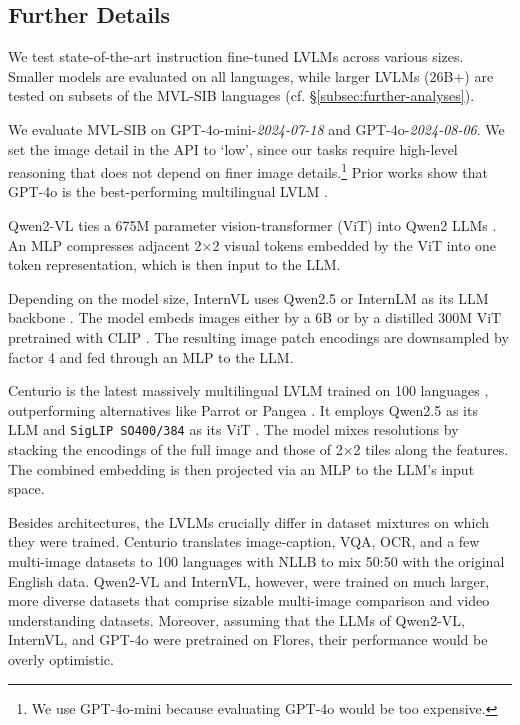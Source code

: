 \clearpage
\subsection{Further Details}
\label{app:subsec:exp-details}

 We test state-of-the-art instruction fine-tuned LVLMs across various sizes. Smaller models are evaluated on all languages, while larger LVLMs (26B+) are tested on subsets of the MVL-SIB languages (cf. \S\ref{subsec:further-analyses}).

 We evaluate MVL-SIB on GPT-4o-mini-\textit{2024-07-18} and GPT-4o-\textit{2024-08-06}. We set the image detail in the API to `low', since our tasks require high-level reasoning that does not depend on finer image details.\footnote{We use GPT-4o-mini because evaluating GPT-4o would be too expensive.} Prior works show that GPT-4o is the best-performing multilingual LVLM \cite{schneider-sitaram-2024-m5, vayani2024alm}.

 Qwen2-VL ties a 675M parameter vision-transformer (ViT) into Qwen2 LLMs \cite{wang2024qwen2vl}. An MLP compresses adjacent 2×2 visual tokens embedded by the ViT into one token representation, which is then input to the LLM. 

 Depending on the model size, InternVL uses Qwen2.5 or InternLM as its LLM backbone  \cite{chen2024internvl}. The model embeds images either by a 6B or by a distilled 300M ViT pretrained with CLIP \cite{radford2021clip}. The resulting image patch encodings are downsampled by factor 4 and fed through an MLP to the LLM.

 Centurio is the latest massively multilingual LVLM trained on 100 languages \cite{geigle2025centurio}, outperforming alternatives like Parrot \cite{sun2024parrot} or Pangea \cite{yue2024pangea}. It employs Qwen2.5 as its LLM \cite{yang2024qwen2technicalreport} and \texttt{SigLIP SO400/384} as its ViT \cite{zhai2023sigmoid}. The model mixes resolutions by stacking the encodings of the full image and those of 2×2 tiles along the features. The combined embedding is then projected via an MLP to the LLM's input space.

Besides architectures, the LVLMs crucially differ in dataset mixtures on which they were trained. Centurio translates image-caption, VQA, OCR, and a few multi-image datasets to 100 languages with NLLB \cite{nllbteam2022language} to mix 50:50 with the original English data. Qwen2-VL and InternVL, however, were trained on much larger, more diverse datasets that comprise sizable multi-image comparison and video understanding datasets. Moreover, assuming that the LLMs of Qwen2-VL, InternVL, and GPT-4o were pretrained on Flores, their performance would be overly optimistic.


